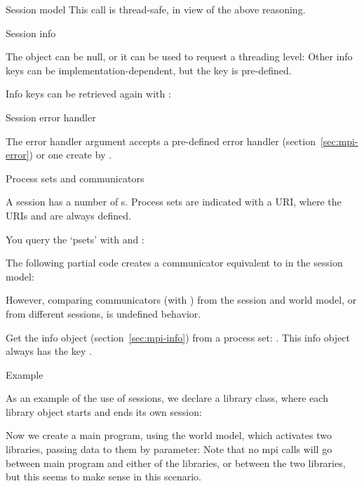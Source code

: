 \begin{mpifournote}{Session model}
This call is thread-safe, in view of the above reasoning.

 {Session info}

The  object can be null, or
it can be used to request a threading level:
%
%
Other info keys can be implementation-dependent,
but the key  is pre-defined.

Info keys can be retrieved again with :
%

 {Session error handler}

The error handler argument accepts a pre-defined error handler
(section~\ref{sec:mpi-error})
or one create by .

 {Process sets and communicators}

A session has a number of s.
Process sets are indicated with a \acf{URI},
where the \acp{URI}  and 
are always defined.

You query the `psets' with 
and :
%

The following partial code creates a communicator equivalent to 
in the session model:
%

However, comparing communicators (with )
from the session and world model,
or from different sessions,
is undefined behavior.

\begin{comment}
  The resulting communicator compares as \indexmpishow{MPI_CONGRUENT}
  under \indexmpishow{MPI_Comm_compare}:
  \csnippetwithoutput{sessionmix}{examples/mpi/c}{sessionmix}
\end{comment}

Get the info object (section~\ref{sec:mpi-info}) from a process set:
.
This info object always has the key .

 {Example}

As an example of the use of sessions, we declare a library class,
where each library object starts and ends its own session:
%

Now we create a main program, using the world model,
which activates two libraries,
passing data to them by parameter:
%
%
Note that no mpi calls will go between main program and either
of the libraries,
or between the two libraries,
but this seems to make sense in this scenario.


\end{mpifournote}
